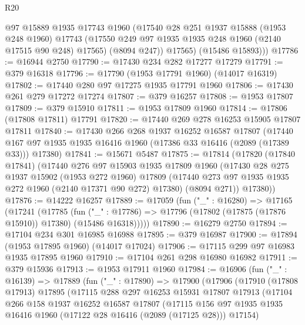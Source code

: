 \begin{lexlean}{R20}
\begin{coremodule}
          @97
          @15889
          @1935
          @17743
          @1960
          (@17540
            @28
            @251
            @1937
            @15888
            (@1953 @248 @1960)
            @17743
            (@17550 @249 @97 @1935 @1935 @248 @1960 (@2140 @17515 @90 @248) @17565)
            (@8094 @247))
          @17565)
        (@15486 @15893)))
@17786 := @16944 @2750
@17790 := @17430 @234 @282 @17277 @17279
@17791 := @379 @16318
@17796 := @17790 (@1953 @17791 @1960) (@14017 @16319)
@17802 := @17440 @280 @97 @17275 @1935 @17791 @1960
@17806 := @17430 @261 @279 @17272 @17274
@17807 := @379 @16257
@17808 := @1953 @17807
@17809 := @379 @15910
@17811 := @1953 @17809 @1960
@17814 := @17806 (@17808 @17811) @17791
@17820 := @17440 @269 @278 @16253 @15905 @17807 @17811
@17840 := @17430
    @266
    @268
    @1937
    @16252
    @16587
    @17807
    (@17440 @167 @97 @1935 @1935 @16416 @1960 (@17386 @33 @16416 (@2089 (@17389 @33))) @17380)
@17841 := @15671 @5487
@17875 := @17814
    (@17820
      (@17840 @17841)
      (@17440
        @276
        @97
        @15903
        @1935
        @17809
        @1960
        (@17430
          @28
          @275
          @1937
          @15902
          (@1953 @272 @1960)
          @17809
          (@17440 @273 @97 @1935 @1935 @272 @1960 (@2140 @17371 @90 @272) @17380)
          (@8094 @271))
        @17380))
@17876 := @14222 @16257
@17889 := @17059
    (fun ("_" : @16280) =>
    @17165
      (@17241
        (@17785
          (fun ("_" : @17786) => @17796 (@17802 (@17875 (@17876 @15910)) @17380) (@15486 @16318)))))
@17890 := @16279 @2750
@17894 := @17104 @234 @301 @16985 @16988
@17895 := @379 @16987
@17900 := @17894 (@1953 @17895 @1960) (@14017 @17024)
@17906 := @17115 @299 @97 @16983 @1935 @17895 @1960
@17910 := @17104 @261 @298 @16980 @16982
@17911 := @379 @15936
@17913 := @1953 @17911 @1960
@17984 := @16906
    (fun ("_" : @16139) =>
    @17889
      (fun ("_" : @17890) =>
      @17900
        (@17906
          (@17910
            (@17808 @17913)
            @17895
            (@17115
              @288
              @297
              @16253
              @15931
              @17807
              @17913
              (@17104
                @266
                @158
                @1937
                @16252
                @16587
                @17807
                (@17115
                  @156
                  @97
                  @1935
                  @1935
                  @16416
                  @1960
                  (@17122 @28 @16416 (@2089 (@17125 @28)))
                  @17154)

\end{coremodule}
\end{lexlean}
